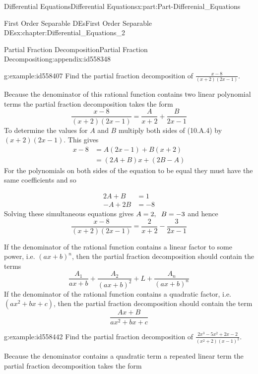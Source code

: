 \documentclass[oneside,10pt,]{book}
\numberwithin{equation}{section}
\newcommand{\amp}{&}
\begin{document}
\begin{partptx}{Differential Equations}{}{Differential Equations}{}{}{x:part:Part-Differenial_Equations}
\begin{chapterptx}{First Order Separable DEs}{}{First Order Separable DEs}{}{}{x:chapter:Differential_Equations_2}
\begin{appendixptx}{Partial Fraction Decomposition}{}{Partial Fraction Decomposition}{}{}{g:appendix:id558348}
\begin{example}{}{g:example:id558407}%
Find the partial fraction decomposition of \(\frac{x-8}{(x+2)(2x-1)}\).%
\par\smallskip%
\noindent\hypertarget{g:solution:id558411}{}Because the denominator of this rational function contains two linear polynomial terms the partial fraction decomposition takes the form%
\begin{equation}
\frac{x-8}{(x+2)(2x-1)}=\frac{A}{x+2}+\frac{B}{2x-1}\label{g:men:id558429}
\end{equation}
To determine the values for \(A\) and \(B\) multiply both sides of (10.A.4) by \((x+2)(2x-1)\). This gives %
\begin{align*}
x-8 \amp=A(2x-1)+B(x+2)\\
\amp =(2A+B)x+(2B-A)
\end{align*}
%
 For the polynomials on both sides of the equation to be equal they must have the same coefficients and so \par
%
\begin{align*}
2A+B \amp=1\\
-A+2B \amp=-8
\end{align*}
%
 Solving these simultaneous equations gives \(A=2,\hspace{2mm} B=-3\) and hence%
\begin{equation*}
\frac{x-8}{(x+2)(2x-1)}=\frac{2}{x+2}-\frac{3}{2x-1}
\end{equation*}
%
\end{example}
If the denominator of the rational function contains a linear factor to some power, i.e. \((ax+b)^n\), then the partial fraction decomposition should contain the terms%
\begin{equation*}
\frac{A_1}{ax+b}+\frac{A_2}{(ax+b)^2}+L+\frac{A_n}{(ax+b)^n}
\end{equation*}
If the denominator of the rational function contains a quadratic factor, i.e. \((ax^2+bx+c)\), then the partial fraction decomposition should contain the term%
\begin{equation*}
\frac{Ax+B}{ax^2+bx+c}
\end{equation*}
%
\begin{example}{}{g:example:id558442}%
Find the partial fraction decomposition of \(\frac{2x^3-5x^2+2x-2}{(x^2+2)(x-1)^2}\).%
\par\smallskip%
\noindent\hypertarget{g:solution:id558480}{}Because the denominator contains a quadratic term a repeated linear term the partial fraction decomposition takes the form%
\begin{equation}

\end{equation}
\end{example}
\end{appendixptx}
\end{chapterptx}
\end{partptx}
\end{document}
